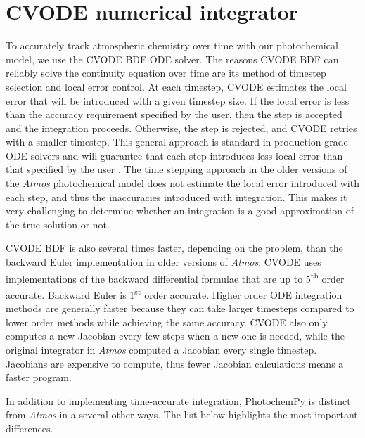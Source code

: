 \documentclass[9pt,twoside,lineno]{pnas-new}
\begin{document}
\section*{CVODE numerical integrator}


To accurately track atmospheric chemistry over time with our photochemical model, we use the CVODE BDF ODE solver. The reasons CVODE BDF can reliably solve the continuity equation over time are its method of timestep selection and local error control. At each timestep, CVODE estimates the local error that will be introduced with a given timestep size. If the local error is less than the accuracy requirement specified by the user, then the step is accepted and the integration proceeds. Otherwise, the step is rejected, and CVODE retries with a smaller timestep. This general approach is standard in production-grade ODE solvers and will guarantee that each step introduces less local error than that specified by the user \cite{Hairer_1996}. The time stepping approach in the older versions of the \emph{Atmos} photochemical model does not estimate the local error introduced with each step, and thus the inaccuracies introduced with integration. This makes it very challenging to determine whether an integration is a good approximation of the true solution or not.

CVODE BDF is also several times faster, depending on the problem, than the backward Euler implementation in older versions of \emph{Atmos}. CVODE uses implementations of the backward differential formulae that are up to 5\textsuperscript{th} order accurate. Backward Euler is 1\textsuperscript{st} order accurate. Higher order ODE integration methods are generally faster because they can take larger timesteps compared to lower order methods while achieving the same accuracy. CVODE also only computes a new Jacobian every few steps when a new one is needed, while the original integrator in \emph{Atmos} computed a Jacobian every single timestep. Jacobians are expensive to compute, thus fewer Jacobian calculations means a faster program.

In addition to implementing time-accurate integration, PhotochemPy is distinct from \emph{Atmos} in a several other ways. The list below highlights the most important differences.
\end{document}

